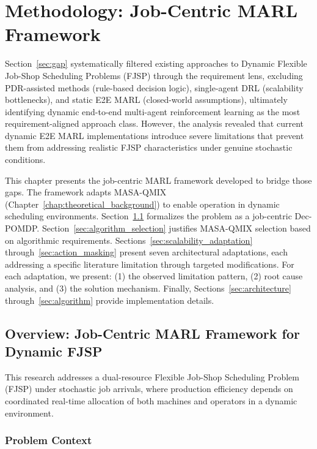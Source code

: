 \chapter{Methodology: Job-Centric MARL Framework}
\label{chap:methodology}

Section~\ref{sec:gap} systematically filtered existing approaches to Dynamic Flexible Job-Shop Scheduling Problems (FJSP) through the requirement lens, excluding PDR-assisted methods (rule-based decision logic), single-agent DRL (scalability bottlenecks), and static E2E MARL (closed-world assumptions), ultimately identifying dynamic end-to-end multi-agent reinforcement learning as the most requirement-aligned approach class. However, the analysis revealed that current dynamic E2E MARL implementations introduce severe limitations that prevent them from addressing realistic FJSP characteristics under genuine stochastic conditions.

This chapter presents the job-centric MARL framework developed to bridge those gaps. The framework adapts MASA-QMIX (Chapter~\ref{chap:theoretical_background}) to enable operation in dynamic scheduling environments. Section~\ref{sec:overview} formalizes the problem as a job-centric Dec-POMDP. Section~\ref{sec:algorithm_selection} justifies MASA-QMIX selection based on algorithmic requirements. Sections~\ref{sec:scalability_adaptation} through~\ref{sec:action_masking} present seven architectural adaptations, each addressing a specific literature limitation through targeted modifications. For each adaptation, we present: (1) the observed limitation pattern, (2) root cause analysis, and (3) the solution mechanism. Finally, Sections~\ref{sec:architecture} through~\ref{sec:algorithm} provide implementation details.


\section{Overview: Job-Centric MARL Framework for Dynamic FJSP}
\label{sec:overview}

This research addresses a dual-resource Flexible Job-Shop Scheduling Problem (FJSP) under stochastic job arrivals, where production efficiency depends on coordinated real-time allocation of both machines and operators in a dynamic environment.

\subsection{Problem Context}

